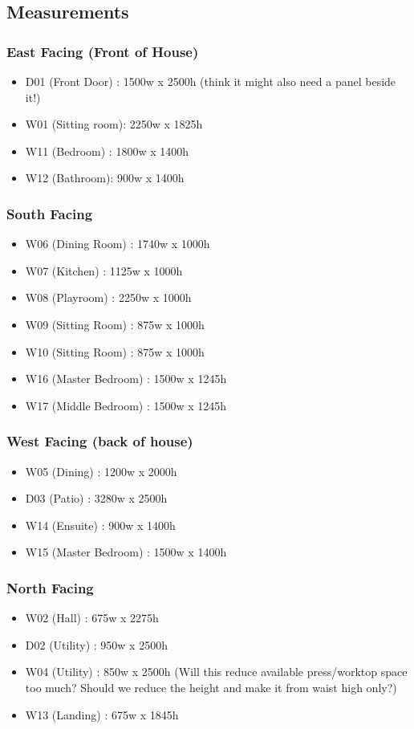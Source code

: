 \subsection{Measurements}
\subsubsection{East Facing (Front of House)}
\begin{itemize}
\item D01 (Front Door) : 1500w x 2500h (think it might also need a panel beside it!)
\item W01 (Sitting room): 2250w x 1825h
\item W11 (Bedroom) : 1800w x 1400h
\item W12 (Bathroom): 900w x 1400h
\end{itemize}    
    
\subsubsection{South Facing}
\begin{itemize}
\item W06 (Dining Room) : 1740w x 1000h
\item W07 (Kitchen) : 1125w x 1000h
\item W08 (Playroom) : 2250w x 1000h
\item W09 (Sitting Room) : 875w x 1000h
\item W10 (Sitting Room) : 875w x 1000h
\item W16 (Master Bedroom) : 1500w x 1245h
\item W17 (Middle Bedroom) : 1500w x 1245h
\end{itemize}

\subsubsection{West Facing (back of house)}
\begin{itemize}
\item W05 (Dining) : 1200w x 2000h
\item D03 (Patio) : 3280w x 2500h
\item W14 (Ensuite) : 900w x 1400h
\item W15 (Master Bedroom) : 1500w x 1400h    
\end{itemize}

\subsubsection{North Facing}
\begin{itemize}
\item W02 (Hall) : 675w x 2275h
\item D02 (Utility) : 950w x 2500h
\item W04 (Utility) : 850w x 2500h (Will this reduce available press/worktop space too much? 
        Should we reduce the height and make it from waist high only?)
\item W13 (Landing) : 675w x 1845h
\end{itemize}

